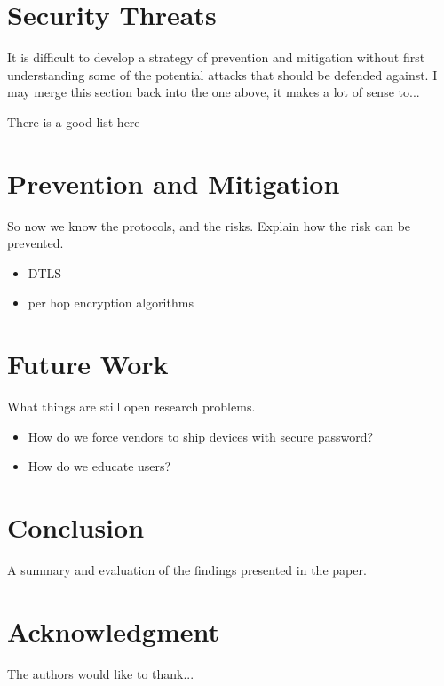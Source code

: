\documentclass[11pt,journal,compsoc]{IEEEtran}
\begin{document}
\section{Security Threats}
It is difficult to develop a strategy of prevention and mitigation without
first understanding some of the potential attacks that should be defended
against. I may merge this section back into the one above, it makes a lot of sense to... 

There is a good list here \cite{Ning2013}


\section{Prevention and Mitigation}
So now we know the protocols, and the risks. Explain how the risk can be
prevented.

\begin{itemize}
\item DTLS
\item per hop encryption algorithms
\end{itemize}


\section{Future Work}
What things are still open research problems. 

\begin{itemize}
\item How do we force vendors to ship devices with secure password?
\item How do we educate users?
\end{itemize}


\section{Conclusion}
A summary and evaluation of the findings presented in the paper.



\section*{Acknowledgment}

The authors would like to thank...


\end{document}
